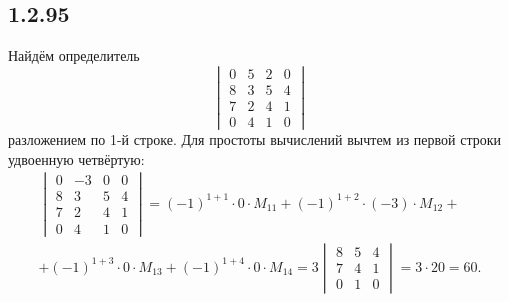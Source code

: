 \subsection{1.2.95}

Найдём определитель
\[
\begin{vmatrix}
	0 & 5 & 2 & 0 \\
	8 & 3 & 5 & 4 \\
	7 & 2 & 4 & 1 \\
	0 & 4 & 1 & 0
\end{vmatrix}
\]
разложением по 1-й строке. Для простоты вычислений вычтем из первой строки удвоенную четвёртую:
\begin{multline*}
	\begin{vmatrix}
		0 & -3 & 0 & 0 \\
		8 & 3 & 5 & 4 \\
		7 & 2 & 4 & 1 \\
		0 & 4 & 1 & 0
	\end{vmatrix}
	=(-1)^{1+1}\cdot 0\cdot M_{11}+(-1)^{1+2}\cdot (-3)\cdot M_{12}+ \\
	+(-1)^{1+3}\cdot 0\cdot M_{13}+(-1)^{1+4}\cdot 0\cdot M_{14}=3
	\begin{vmatrix}
		8 & 5 & 4 \\
		7 & 4 & 1 \\
		0 & 1 & 0
	\end{vmatrix}
	=3\cdot20=60.
\end{multline*}